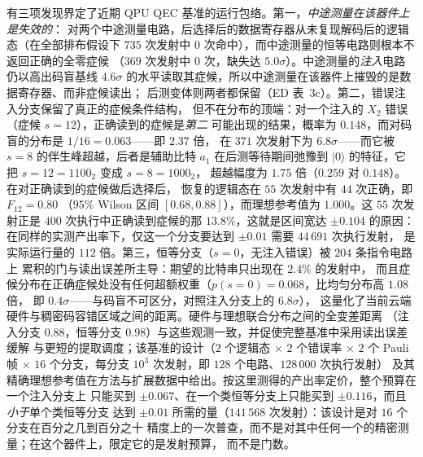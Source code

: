 \documentclass[11pt,a4paper]{article}
\newcommand{\ket}[1]{\lvert #1\rangle}
\begin{document}
有三项发现界定了近期 QPU QEC 基准的运行包络。第一，\emph{中途测量在该器件上是失效的}：
对两个中途测量电路，后选择后的数据寄存器从未复现解码后的逻辑态（在全部排布假设下
$735$ 次发射中 $0$ 次命中），而中途测量的恒等电路则根本不返回正确的全零症候
（$369$ 次发射中 $0$ 次，缺失达 $5.0\sigma$）。中途测量的\emph{注入}电路仍以高出码盲基线
$4.6\sigma$ 的水平读取其症候，所以中途测量在该器件上摧毁的是数据寄存器、而非症候读出；
后测变体则两者都保留（ED 表~3c）。第二，错误注入分支保留了真正的症候条件结构，
但不在分布的顶端：对一个注入的 $X_2$ 错误（症候 $s=12$），正确读到的症候是\emph{第二}
可能出现的结果，概率为 $0.148$，而对码盲的分布是 $1/16=0.063$——即 $2.37$ 倍，
在 $371$ 次发射下为 $6.8\sigma$——而它被 $s=8$ 的伴生峰超越，后者是辅助比特 $a_1$
在后测等待期间弛豫到 $\ket 0$ 的特征，它把 $s=12=1100_2$ 变成 $s=8=1000_2$，
超越幅度为 $1.75$ 倍（$0.259$ 对 $0.148$）。在对正确读到的症候做后选择后，
恢复的逻辑态在 $55$ 次发射中有 $44$ 次正确，即 $F_{12}=0.80$
（$95\%$ Wilson 区间 $[0.68,0.88]$），而理想参考值为 $1.000$。这 $55$ 次发射正是
$400$ 次执行中正确读到症候的那 $13.8\%$，这就是区间宽达 $\pm0.104$ 的原因：
在同样的实测产出率下，仅这一个分支要达到 $\pm0.01$ 需要 $44\,691$ 次执行发射，
是实际运行量的 $112$ 倍。第三，恒等分支（$s=0$，无注入错误）被 $204$ 条指令电路上
累积的门与读出误差所主导：期望的比特串只出现在 $2.4\%$ 的发射中，
而且症候分布在正确症候处没有任何超额权重（$p(s{=}0)=0.068$，比均匀分布高 $1.08$ 倍，
即 $0.4\sigma$——与码盲不可区分，对照注入分支上的 $6.8\sigma$），
这量化了当前云端硬件与稠密码容错区域之间的距离。硬件与理想联合分布之间的全变差距离
（注入分支 $0.88$，恒等分支 $0.98$）与这些观测一致，并促使完整基准中采用读出误差缓解
与更短的提取调度；该基准的设计（$2$ 个逻辑态 $\times$ $2$ 个错误率 $\times$ $2$ 个 Pauli 帧
$\times$ $16$ 个分支，每分支 $10^3$ 次发射，即 $128$ 个电路、$128\,000$ 次执行发射）
及其精确理想参考值在方法与扩展数据中给出。按这里测得的产出率定价，整个预算在一个注入分支上
只能买到 $\pm0.067$、在一个类恒等分支上只能买到 $\pm0.116$，而且\emph{小于}单个类恒等分支
达到 $\pm0.01$ 所需的量（$141\,568$ 次发射）：该设计是对 $16$ 个分支在百分之几到百分之十
精度上的一次普查，而不是对其中任何一个的精密测量；在这个器件上，限定它的是发射预算，
而不是门数。
\end{document}
